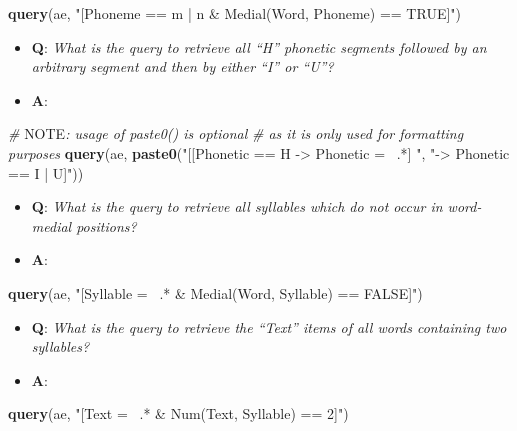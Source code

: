 \documentclass[]{book}
\newenvironment{Shaded}{\begin{snugshade}}{\end{snugshade}}
\newcommand{\AlertTok}[1]{\textcolor[rgb]{0.94,0.16,0.16}{#1}}
\newcommand{\CommentTok}[1]{\textcolor[rgb]{0.56,0.35,0.01}{\textit{#1}}}
\newcommand{\KeywordTok}[1]{\textcolor[rgb]{0.13,0.29,0.53}{\textbf{#1}}}
\newcommand{\NormalTok}[1]{#1}
\newcommand{\StringTok}[1]{\textcolor[rgb]{0.31,0.60,0.02}{#1}}
\providecommand{\tightlist}{%
  \setlength{\itemsep}{0pt}\setlength{\parskip}{0pt}}
\begin{document}
\begin{Shaded}
\begin{Highlighting}[]
\KeywordTok{query}\NormalTok{(ae, }\StringTok{"[Phoneme == m | n & Medial(Word, Phoneme) == TRUE]"}\NormalTok{)}
\end{Highlighting}
\end{Shaded}

\begin{itemize}
\tightlist
\item
  \textbf{Q}: \emph{What is the query to retrieve all ``H'' phonetic segments followed by an arbitrary segment and then by either ``I'' or ``U''?}
\item
  \textbf{A}:
\end{itemize}

\begin{Shaded}
\begin{Highlighting}[]
\CommentTok{# }\AlertTok{NOTE}\CommentTok{: usage of paste0() is optional}
\CommentTok{# as it is only used for formatting purposes}
\KeywordTok{query}\NormalTok{(ae, }\KeywordTok{paste0}\NormalTok{(}\StringTok{"[[Phonetic == H -> Phonetic =~ .*] "}\NormalTok{,}
                 \StringTok{"-> Phonetic == I | U]"}\NormalTok{))}
\end{Highlighting}
\end{Shaded}

\begin{itemize}
\tightlist
\item
  \textbf{Q}: \emph{What is the query to retrieve all syllables which do not occur in word-medial positions?}
\item
  \textbf{A}:
\end{itemize}

\begin{Shaded}
\begin{Highlighting}[]
\KeywordTok{query}\NormalTok{(ae, }\StringTok{"[Syllable =~ .* & Medial(Word, Syllable) == FALSE]"}\NormalTok{)}
\end{Highlighting}
\end{Shaded}

\begin{itemize}
\tightlist
\item
  \textbf{Q}: \emph{What is the query to retrieve the ``Text'' items of all words containing two syllables?}
\item
  \textbf{A}:
\end{itemize}

\begin{Shaded}
\begin{Highlighting}[]
\KeywordTok{query}\NormalTok{(ae, }\StringTok{"[Text =~ .* & Num(Text, Syllable) == 2]"}\NormalTok{)}
\end{Highlighting}
\end{Shaded}
\end{document}
